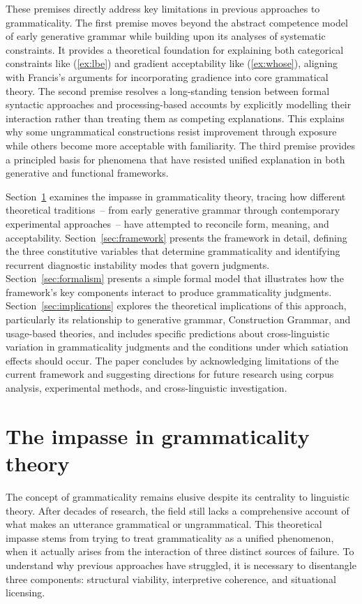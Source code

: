 \documentclass[12pt,letterpaper]{article}
\begin{document}
These premises directly address key limitations in previous approaches to grammaticality. The first premise moves beyond the abstract competence model of early generative grammar while building upon its analyses of systematic constraints. It provides a theoretical foundation for explaining both categorical constraints like (\ref{ex:lbe}) and gradient acceptability like (\ref{ex:whose}), aligning with Francis's \autocite{francis2022} arguments for incorporating gradience into core grammatical theory. The second premise resolves a long-standing tension between formal syntactic approaches and processing-based accounts by explicitly modelling their interaction rather than treating them as competing explanations. This explains why some ungrammatical constructions resist improvement through exposure while others become more acceptable with familiarity. The third premise provides a principled basis for phenomena that have resisted unified explanation in both generative and functional frameworks.

Section~\ref{sec:previous} examines the impasse in grammaticality theory, tracing how different theoretical traditions~--  from early generative grammar through contemporary experimental approaches~--  have attempted to reconcile form, meaning, and acceptability. Section~\ref{sec:framework} presents the framework in detail, defining the three constitutive variables that determine grammaticality and identifying recurrent diagnostic instability modes that govern judgments. Section~\ref{sec:formalism} presents a simple formal model that illustrates how the framework's key components interact to produce grammaticality judgments. Section~\ref{sec:implications} explores the theoretical implications of this approach, particularly its relationship to generative grammar, Construction Grammar, and usage-based theories, and includes specific predictions about cross-linguistic variation in grammaticality judgments and the conditions under which satiation effects should occur. The paper concludes by acknowledging limitations of the current framework and suggesting directions for future research using corpus analysis, experimental methods, and cross-linguistic investigation.

\section{The impasse in grammaticality theory}\label{sec:previous}

The concept of grammaticality remains elusive despite its centrality to linguistic theory. After decades of research, the field still lacks a comprehensive account of what makes an utterance grammatical or ungrammatical. This theoretical impasse stems from trying to treat grammaticality as a unified phenomenon, when it actually arises from the interaction of three distinct sources of failure. To understand why previous approaches have struggled, it is necessary to disentangle three components: structural viability, interpretive coherence, and situational licensing.
\end{document}
